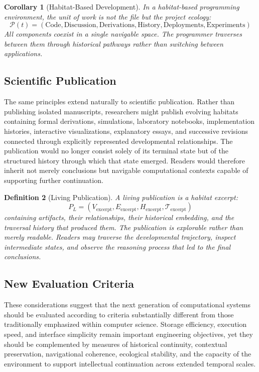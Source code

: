 \documentclass[12pt,oneside]{article}
\newtheorem{definition}{Definition}[section]
\newtheorem{corollary}[definition]{Corollary}
\theoremstyle{remark}
\begin{document}
\begin{corollary}[Habitat-Based Development]
In a habitat-based programming environment, the unit of work is not the file but the project ecology:
\[
\mathcal{P}(t) = (\text{Code}, \text{Discussion}, \text{Derivations}, \text{History}, \text{Deployments}, \text{Experiments})
\]
All components coexist in a single navigable space. The programmer traverses between them through historical pathways rather than switching between applications.
\end{corollary}

\subsection{Scientific Publication}

The same principles extend naturally to scientific publication. Rather than publishing isolated manuscripts, researchers might publish evolving habitats containing formal derivations, simulations, laboratory notebooks, implementation histories, interactive visualizations, explanatory essays, and successive revisions connected through explicitly represented developmental relationships. The publication would no longer consist solely of its terminal state but of the structured history through which that state emerged. Readers would therefore inherit not merely conclusions but navigable computational contexts capable of supporting further continuation.

\begin{definition}[Living Publication]
A living publication is a habitat excerpt:
\[
P_L = (V_{\text{excerpt}}, E_{\text{excerpt}}, H_{\text{excerpt}}, \mathcal{T}_{\text{excerpt}})
\]
containing artifacts, their relationships, their historical embedding, and the traversal history that produced them. The publication is explorable rather than merely readable. Readers may traverse the developmental trajectory, inspect intermediate states, and observe the reasoning process that led to the final conclusions.
\end{definition}

\subsection{New Evaluation Criteria}

These considerations suggest that the next generation of computational systems should be evaluated according to criteria substantially different from those traditionally emphasized within computer science. Storage efficiency, execution speed, and interface simplicity remain important engineering objectives, yet they should be complemented by measures of historical continuity, contextual preservation, navigational coherence, ecological stability, and the capacity of the environment to support intellectual continuation across extended temporal scales.
\end{document}
